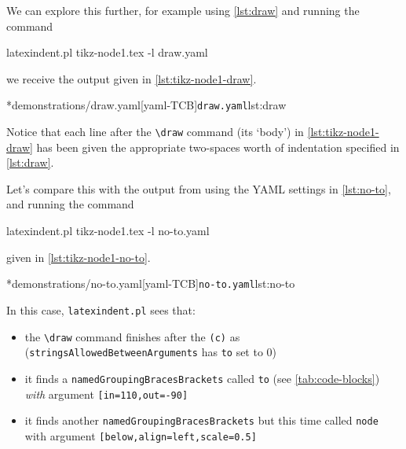 	We can explore this further, for example using \cref{lst:draw} and running the command \begin{commandshell}
latexindent.pl tikz-node1.tex -l draw.yaml  
\end{commandshell} we receive the output given in \cref{lst:tikz-node1-draw}.

	\begin{minipage}{.45\textwidth}
	\end{minipage}
	\hfill
	\begin{minipage}{.45\textwidth}
		\cmhlistingsfromfile[style=yaml-LST]*{demonstrations/draw.yaml}[yaml-TCB]{\texttt{draw.yaml}}{lst:draw}
	\end{minipage}

	Notice that each line after the \lstinline!\draw! command (its `body') in \cref{lst:tikz-node1-draw} has been given the appropriate two-spaces worth of indentation specified in \cref{lst:draw}.

	Let's compare this with the output from using the YAML settings in \cref{lst:no-to}, and running the command \begin{commandshell}
latexindent.pl tikz-node1.tex -l no-to.yaml  
\end{commandshell} given in \cref{lst:tikz-node1-no-to}.

	\begin{minipage}{.45\textwidth}
	\end{minipage}
	\hfill
	\begin{minipage}{.45\textwidth}
		\cmhlistingsfromfile[style=yaml-LST]*{demonstrations/no-to.yaml}[yaml-TCB]{\texttt{no-to.yaml}}{lst:no-to}
	\end{minipage}

	In this case, \texttt{latexindent.pl} sees that: \begin{itemize} \item the \lstinline!\draw! command finishes after the \lstinline!(c)! as (\texttt{stringsAllowedBetweenArguments} has \texttt{to} set to $0$)
		\item it finds a \texttt{namedGroupingBracesBrackets} called \texttt{to} (see \vref{tab:code-blocks}) \emph{with} argument \lstinline![in=110,out=-90]!
		\item it finds another \texttt{namedGroupingBracesBrackets} but this time called \texttt{node} with argument \lstinline![below,align=left,scale=0.5]! \end{itemize} 

